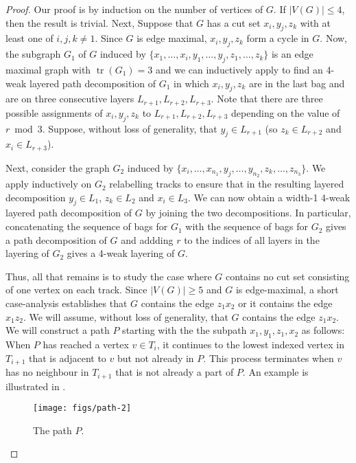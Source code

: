 \documentclass{patmorin}
\DeclareMathOperator{\tr}{tr}
\begin{document}
\begin{proof}
  Our proof is by induction on the number of vertices of $G$.
  If $|V(G)|\le 4$, then the result is trivial.
  Next, Suppose
  that $G$ has a cut set $x_i,y_j,z_k$ with at least one of $i,j,k\neq 1$.
  Since $G$ is edge maximal, $x_i,y_j,z_k$ form a cycle in $G$.  Now, the
  subgraph $G_1$ of $G$ induced by $\{x_1,\ldots,x_i, y_1,\ldots,y_j,
  z_1,\ldots,z_k\}$ is an edge maximal graph with $\tr(G_1)=3$ and
  we can inductively apply  to find an 4-weak layered
  path decomposition of $G_1$ in which $x_i,y_j,z_k$ are in the last
  bag and are on three consecutive layers $L_{r+1},L_{r+2},L_{r+3}$.
  Note that there are three possible assignments of $x_i,y_j,z_k$ to
  $L_{r+1},L_{r+2},L_{r+3}$ depending on the value of $r\bmod 3$.  Suppose, without loss of generality, that $y_j\in L_{r+1}$ (so $z_k\in L_{r+2}$ and $x_i\in L_{r+3}$).

  Next, consider the graph $G_2$ induced by
  $\{x_i,\ldots,x_{n_1},y_j,\ldots,y_{n_2},z_k,\ldots,z_{n_3}\}$.
  We apply  inductively on $G_2$ relabelling tracks
  to ensure that in the
  resulting layered decomposition $y_j\in L_1$, $z_k\in L_2$ and $x_i\in
  L_3$.   We can now obtain a width-1 4-weak layered path decomposition of
  $G$ by joining the two decompositions.  In particular,  concatenating
  the sequence of bags for $G_1$ with the sequence of bags for $G_2$
  gives a path decomposition of $G$ and addding $r$ to the indices of
  all layers in the layering of $G_2$ gives a 4-weak layering of $G$.

  Thus, all that remains is to study the case where $G$ contains no
  cut set consisting of one vertex on each track.  Since $|V(G)|\ge
  5$ and $G$ is edge-maximal, a short case-analysis establishes that
  $G$ contains the edge $z_1x_2$ or it contains the edge $x_1z_2$.
  We will assume, without loss of generality, that $G$ contains the
  edge $z_1x_2$.  We will construct a path $P$ starting with the the
  subpath $x_1,y_1,z_1,x_2$ as follows: When $P$ has reached a vertex
  $v\in T_i$, it continues to the lowest indexed vertex in $T_{i+1}$ that
  is adjacent to $v$ but not already in $P$. This process terminates when
  $v$ has no neighbour in $T_{i+1}$ that is not already a part of $P$.
  An example is illustrated in .

  \begin{figure}
     \begin{center}
        \texttt{[image: figs/path-2]}
     \end{center}
     \caption{The path $P$.}
  \end{figure}


\end{proof}
\end{document}

